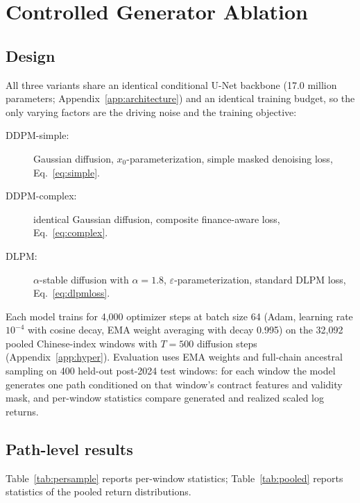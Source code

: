 \documentclass[12pt,letterpaper]{article}
\newcommand{\nTestWindows}{400}
\begin{document}
\section{Controlled Generator Ablation}\label{sec:experiments}

\subsection{Design}

All three variants share an identical conditional U-Net backbone (17.0
million parameters; Appendix~\ref{app:architecture}) and an identical
training budget, so the only varying factors are the driving noise and the
training objective:
\begin{description}
\item[DDPM-simple:] Gaussian diffusion, $x_0$-parameterization, simple
  masked denoising loss, Eq.~\eqref{eq:simple}.
\item[DDPM-complex:] identical Gaussian diffusion, composite finance-aware
  loss, Eq.~\eqref{eq:complex}.
\item[DLPM:] $\alpha$-stable diffusion with $\alpha = 1.8$,
  $\varepsilon$-parameterization, standard DLPM loss,
  Eq.~\eqref{eq:dlpmloss}.
\end{description}
Each model trains for 4{,}000 optimizer steps at batch size 64 (Adam,
learning rate $10^{-4}$ with cosine decay, EMA weight averaging with decay
0.995) on the 32{,}092 pooled Chinese-index windows with $T = 500$ diffusion
steps (Appendix~\ref{app:hyper}). Evaluation uses EMA weights and full-chain
ancestral sampling on \nTestWindows{} held-out post-2024 test windows: for
each window the model generates one path conditioned on that window's
contract features and validity mask, and per-window statistics compare
generated and realized scaled log returns.

\subsection{Path-level results}

Table~\ref{tab:persample} reports per-window statistics;
Table~\ref{tab:pooled} reports statistics of the pooled return
distributions.
\end{document}
